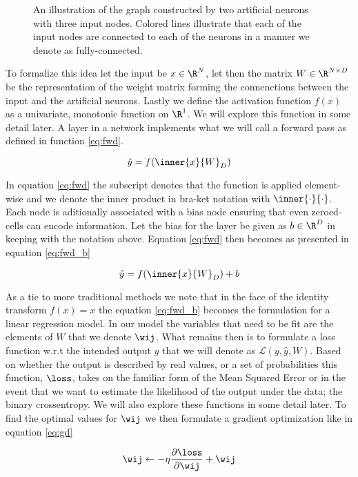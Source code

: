 \begin{figure}[h]
\caption{An illustration of the graph constructed by two artificial neurons with three input nodes. Colored lines illustrate that  each of the input nodes are connected to each of the neurons in a manner we denote as fully-connected.}\label{fig:ann_illustration}
\end{figure}


\noindent To formalize this idea let the input be $x \in \R^N$, let then the matrix $W \in \R^{N \times D}$ be the representation of the weight matrix forming the connenctions between the input and the artificial neurons. Lastly we define the activation function $f(x)$ as a univariate, monotonic function on $\R^1$. We will explore this function in some detail later. A layer in a network implements what we will call a forward pass as defined in function \ref{eq:fwd}.

\begin{equation}\label{eq:fwd}
\hat{y} = f(\inner{x}{W}_D)
\end{equation}

In equation \ref{eq:fwd} the subscript denotes that the function is applied element-wise and we denote the inner product in bra-ket notation with $\inner{\cdot}{\cdot}$. Each node is aditionally associated with a bias node ensuring that even zeroed-cells can encode information. Let the bias for the layer be given as $b \in \R^D$ in keeping with the notation above. Equation \ref{eq:fwd} then becomes as presented in equation \ref{eq:fwd_b}

\begin{equation}\label{eq:fwd_b}
\hat{y} = f(\inner{x}{W}_D) + b
\end{equation}

As a tie to more traditional methods we note that in the face of the identity transform $f(x) = x$ the equation \ref{eq:fwd_b} becomes the formulation for a linear regression model. In our model the variables that need to be fit are the elements of $W$ that we denote $\wij$. What remains then is  to formulate a loss function w.r.t the intended output $y$ that we will denote as $\mathcal{L}(y, \hat{y}, W)$. Based on whether the output is described by real values, or a set of probabilities this function, $\loss$, takes on the familiar form of the Mean Squared Error or in the event that we want to estimate the likelihood of the output under the data; the binary crossentropy. We will also explore these functions in some detail later. To find the optimal values for $\wij$ we then formulate a gradient optimization like in equation \ref{eq:gd}

\begin{equation}\label{eq:gd}
\wij \leftarrow -\eta \frac{\partial \loss}{\partial \wij} + \wij 
\end{equation}